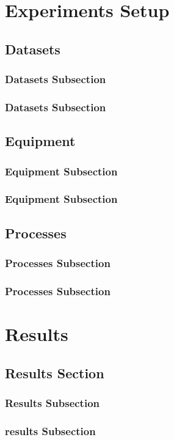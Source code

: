 \documentclass[oneside,14pt]{extarticle}
\begin{document}
	\section{Experiments Setup} 
		\subsection{Datasets}
			\subsubsection{Datasets Subsection}
			\subsubsection{Datasets Subsection}
		\subsection{Equipment}
			\subsubsection{Equipment Subsection}
			\subsubsection{Equipment Subsection}
		\subsection{Processes}
			\subsubsection{Processes Subsection}
			\subsubsection{Processes Subsection}
		\clearpage
	\section{Results} 
		\subsection{Results Section}
			\subsubsection{Results Subsection}
			\subsubsection{results Subsection}
\end{document}
